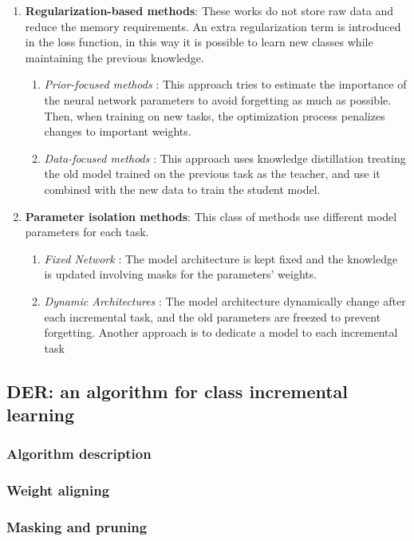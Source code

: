 \begin{enumerate}
    \item \textbf{Regularization-based methods}: These works do not store raw data and reduce the memory requirements. An extra regularization term is introduced in the loss function, in this way it is possible to learn new classes while maintaining the previous knowledge.
    \begin{enumerate}
        \item \textit{Prior-focused methods} \cite{kirkpatrick2017overcoming, lee2017overcoming, zenke2017continual, liu2018rotate, aljundi2018memory, chaudhry2018riemannian}: This approach tries to estimate the importance of the neural network parameters to avoid forgetting as much as possible. Then, when training on new tasks, the optimization process penalizes changes to important weights.
        \item \textit{Data-focused methods} \cite{li2017learning, jung2016less, zhang2020class, rannen2017encoder}: This approach uses knowledge distillation \cite{hinton2015distilling} treating the old model trained on the previous task as the teacher, and use it combined with the new data to train the student model.
    \end{enumerate}
    \item \textbf{Parameter isolation methods}: This class of methods use different model parameters for each task.
    \begin{enumerate}
        \item \textit{Fixed Network} \cite{mallya2018packnet, mallya2018piggyback, serra2018overcoming, fernando2017pathnet}: The model architecture is kept fixed and the knowledge is updated involving masks for the parameters' weights.
        \item \textit{Dynamic Architectures} \cite{rusu2016progressive, xu2018reinforced, aljundi2017expert, rosenfeld2018incremental}: The model architecture dynamically change after each incremental task, and the old parameters are freezed to prevent forgetting. Another approach is to dedicate a model to each incremental task
    \end{enumerate}
\end{enumerate}

\subsection{DER: an algorithm for class incremental learning}
\subsubsection{Algorithm description}
\subsubsection{Weight aligning}
\subsubsection{Masking and pruning}
